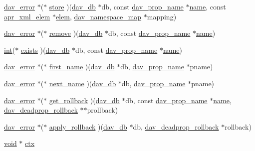 \begin{DoxyCompactItemize}
\item 
\hyperlink{structdav__error}{dav\+\_\+error} $\ast$($\ast$ \hyperlink{structdav__hooks__propdb_a40fcca407427c7cd28077444faea78b9}{store} )(\hyperlink{structdav__db}{dav\+\_\+db} $\ast$db, const \hyperlink{structdav__prop__name}{dav\+\_\+prop\+\_\+name} $\ast$\hyperlink{pcre_8txt_a5a15d68aadb41c771fe50a27c400d49b}{name}, const \hyperlink{structapr__xml__elem}{apr\+\_\+xml\+\_\+elem} $\ast$\hyperlink{structelem}{elem}, \hyperlink{structdav__namespace__map}{dav\+\_\+namespace\+\_\+map} $\ast$mapping)
\item 
\hyperlink{structdav__error}{dav\+\_\+error} $\ast$($\ast$ \hyperlink{structdav__hooks__propdb_a9aefad972daa1f480c897101d10a6b86}{remove} )(\hyperlink{structdav__db}{dav\+\_\+db} $\ast$db, const \hyperlink{structdav__prop__name}{dav\+\_\+prop\+\_\+name} $\ast$\hyperlink{pcre_8txt_a5a15d68aadb41c771fe50a27c400d49b}{name})
\item 
\hyperlink{pcre_8txt_a42dfa4ff673c82d8efe7144098fbc198}{int}($\ast$ \hyperlink{structdav__hooks__propdb_aa6a47cffee52f86169116696a3dba585}{exists} )(\hyperlink{structdav__db}{dav\+\_\+db} $\ast$db, const \hyperlink{structdav__prop__name}{dav\+\_\+prop\+\_\+name} $\ast$\hyperlink{pcre_8txt_a5a15d68aadb41c771fe50a27c400d49b}{name})
\item 
\hyperlink{structdav__error}{dav\+\_\+error} $\ast$($\ast$ \hyperlink{structdav__hooks__propdb_ae5f74e4694737191489f1b2d77bc91ba}{first\+\_\+name} )(\hyperlink{structdav__db}{dav\+\_\+db} $\ast$db, \hyperlink{structdav__prop__name}{dav\+\_\+prop\+\_\+name} $\ast$pname)
\item 
\hyperlink{structdav__error}{dav\+\_\+error} $\ast$($\ast$ \hyperlink{structdav__hooks__propdb_a39e972ee0f305da65f5d03dedea9f587}{next\+\_\+name} )(\hyperlink{structdav__db}{dav\+\_\+db} $\ast$db, \hyperlink{structdav__prop__name}{dav\+\_\+prop\+\_\+name} $\ast$pname)
\item 
\hyperlink{structdav__error}{dav\+\_\+error} $\ast$($\ast$ \hyperlink{structdav__hooks__propdb_a1e7ad8858b88f717b7ed7e04e47f9c5d}{get\+\_\+rollback} )(\hyperlink{structdav__db}{dav\+\_\+db} $\ast$db, const \hyperlink{structdav__prop__name}{dav\+\_\+prop\+\_\+name} $\ast$\hyperlink{pcre_8txt_a5a15d68aadb41c771fe50a27c400d49b}{name}, \hyperlink{structdav__deadprop__rollback}{dav\+\_\+deadprop\+\_\+rollback} $\ast$$\ast$prollback)
\item 
\hyperlink{structdav__error}{dav\+\_\+error} $\ast$($\ast$ \hyperlink{structdav__hooks__propdb_ac4331dd19b3bfbd2f906a4d641aa7c1d}{apply\+\_\+rollback} )(\hyperlink{structdav__db}{dav\+\_\+db} $\ast$db, \hyperlink{structdav__deadprop__rollback}{dav\+\_\+deadprop\+\_\+rollback} $\ast$rollback)
\item 
\hyperlink{group__MOD__ISAPI_gacd6cdbf73df3d9eed42fa493d9b621a6}{void} $\ast$ \hyperlink{structdav__hooks__propdb_ad36446528ace0ec1614928ae09aa84be}{ctx}
\end{DoxyCompactItemize}


